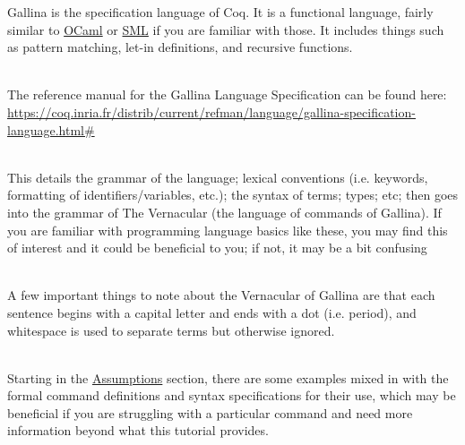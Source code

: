 




Gallina is the specification language of Coq. 
It is a functional language, fairly similar to \href{https://en.wikipedia.org/wiki/OCaml}{OCaml} or 
\href{https://en.wikipedia.org/wiki/Standard_ML}{SML} if you are familiar with those. 
It includes things such as pattern matching, let-in definitions, and recursive functions. 

~\\
The reference manual for the Gallina Language Specification can be found here: 
\\ 
\url{https://coq.inria.fr/distrib/current/refman/language/gallina-specification-language.html#}

~\\ 
This details the grammar of the language; 
lexical conventions (i.e. keywords, formatting of identifiers/variables, etc.); 
the syntax of terms; types; etc; then goes into the grammar of The Vernacular (the language of commands of Gallina). 
If you are familiar with programming language basics like these, you may find this of interest 
and it could be beneficial to you; if not, it may be a bit confusing 

~\\
A few important things to note about the Vernacular of Gallina are that each sentence begins with a capital letter and ends 
with a dot (i.e. period), and whitespace is used to separate terms but otherwise ignored.

~\\ 
Starting in the 
\href{https://coq.inria.fr/distrib/current/refman/language/gallina-specification-language.html#assumptions}
{Assumptions}
section, there are some examples mixed in with the formal command definitions 
and syntax specifications for their use, which may be beneficial if you are struggling with a particular command 
and need more information beyond what this tutorial provides. 











